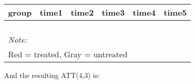 \documentclass[
]{article}
\begin{document}
\begin{table}
\centering
\begin{tabular}[t]{>{}r|>{}r|>{}r|>{}r|>{}r|>{}r}
\hline
group & time1 & time2 & time3 & time4 & time5\\
\hline
\cellcolor{white}{2} & \cellcolor{white}{0.631} & \cellcolor{white}{0.711} & \cellcolor{white}{\textcolor{black}{0.814}} & \cellcolor{white}{\textcolor{black}{0.846}} & \cellcolor{white}{0.826}\\
\hline
\cellcolor{white}{3} & \cellcolor{white}{0.678} & \cellcolor{white}{0.770} & \cellcolor{white}{\textcolor{black}{0.664}} & \cellcolor{white}{\textcolor{black}{0.800}} & \cellcolor{white}{0.784}\\
\hline
\cellcolor{white}{4} & \cellcolor{white}{0.778} & \cellcolor{white}{0.807} & \cellcolor{red}{\textcolor{black}{0.673}} & \cellcolor{red}{\textcolor{black}{0.750}} & \cellcolor{white}{0.868}\\
\hline
\cellcolor{white}{5} & \cellcolor{white}{0.854} & \cellcolor{white}{0.939} & \cellcolor{lightgray}{\textcolor{black}{0.854}} & \cellcolor{lightgray}{\textcolor{black}{0.800}} & \cellcolor{white}{0.855}\\
\hline
\multicolumn{6}{l}{\rule{0pt}{1em}\textit{Note: }}\\
\multicolumn{6}{l}{\rule{0pt}{1em}Red = treated, Gray = untreated}\\
\end{tabular}
\end{table}

And the resulting ATT(4,3) is:
\end{document}
